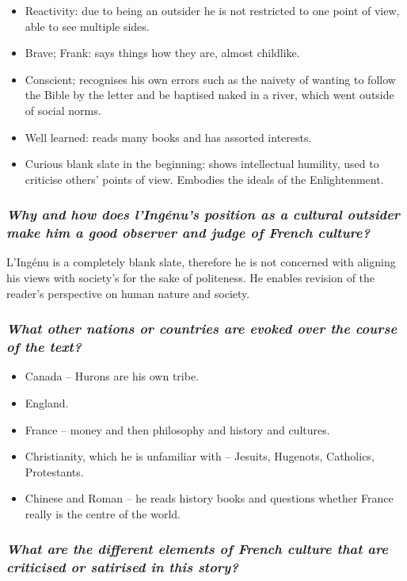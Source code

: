 \documentclass[12pt]{article}
\begin{document}
\begin{itemize}
  \item{Reactivity: due to being an outsider he is not restricted to one point of view, able to see multiple sides.}
  \item{Brave; Frank: says things how they are, almost childlike.}
  \item{Conscient; recognises his own errors such as the naivety of wanting to follow the Bible by the letter and be baptised naked in a river, which went outside of social norms.}
  \item{Well learned: reads many books and has assorted interests.}
  \item{Curious blank slate in the beginning: shows intellectual humility, used to criticise others' points of view. Embodies the ideals of the Enlightenment.}
\end{itemize}

\subsubsection*{\textit{Why and how does l'Ingénu's position as a cultural outsider make him a good observer and judge of French culture?}}

L'Ingénu is a completely blank slate, therefore he is not concerned with aligning his views with society's for the sake of politeness. He enables revision of the reader's perspective on human nature and society.

\subsubsection*{\textit{What other nations or countries are evoked over the course of the text?}}

\begin{itemize}
  \item{Canada -- Hurons are his own tribe.}
  \item{England.}
  \item{France -- money and then philosophy and history and cultures.}
  \item{Christianity, which he is unfamiliar with -- Jesuits, Hugenots, Catholics, Protestants.}
  \item{Chinese and Roman -- he reads history books and questions whether France really is the centre of the world.}
\end{itemize}

\subsubsection*{\textit{What are the different elements of French culture that are criticised or satirised in this story?}}
\end{document}
